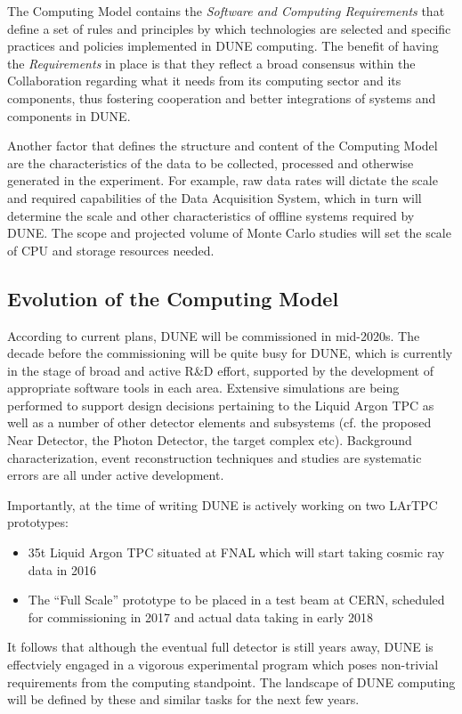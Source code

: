 The Computing Model contains the \textit{Software and Computing Requirements} that define a set of rules and principles by which technologies
are selected and specific practices and policies implemented in DUNE computing. The benefit of having the \textit{Requirements} in place is that they reflect a broad consensus
within the Collaboration regarding what it needs from its computing sector and its components, thus fostering cooperation and better
integrations of systems and components in DUNE.

Another factor that defines the structure and content of the Computing Model are the characteristics of the data to be collected,
processed and otherwise generated in the experiment. For example, raw data rates will dictate the scale and required capabilities
of the Data Acquisition System, which in turn will determine the scale and other characteristics of offline systems required by DUNE.
The scope and projected volume of Monte Carlo studies will set the scale of CPU and storage resources needed.



\subsection{Evolution of the Computing Model}
According to current plans, DUNE will be commissioned in mid-2020s. The decade before the commissioning will be quite busy
for DUNE, which is currently in the stage of broad and active R\&D effort, supported by the development of appropriate 
software tools in each area. Extensive simulations are being performed to support design decisions pertaining to the Liquid 
Argon TPC as well as a number of other detector elements and subsystems (cf. the proposed Near Detector, the Photon Detector, 
the target complex etc). Background characterization, event reconstruction techniques and studies are systematic errors are all under active development.

Importantly, at the time of writing DUNE is actively working on two LArTPC prototypes:
\begin{itemize}
\item 35t Liquid Argon TPC situated at FNAL which will start taking cosmic ray data in 2016
\item The ``Full Scale'' prototype to be placed in a test beam at CERN, scheduled for commissioning in 2017 and actual data taking in early 2018
\end{itemize}

It follows that although the eventual full detector is still years away, DUNE is effectviely engaged in a vigorous experimental program which
poses non-trivial requirements from the computing standpoint. The landscape of DUNE computing will be defined by these and similar tasks for the next few years.

